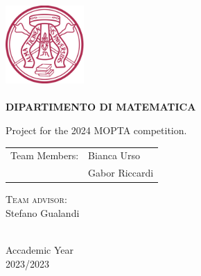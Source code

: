 \thispagestyle{empty}
\begin{center}
	\hrulefill \\
\end{center}

\begin{center}
	\includegraphics[width=3cm]{unipv.png}\\
	
	 \\
	{\bf DIPARTIMENTO DI MATEMATICA }\\
	\vspace*{1cm}
	
	
	\vspace{-8pt}
	\normalsize 
\end{center}
\vspace{2cm}


\begin{center}
	\large Project for the 2024 MOPTA competition.
	

\end{center}

\vspace*{3cm}

\begin{flushleft}
	\begin{tabular}{ll}
		{\sc Team Members:} & {\sc Bianca Urso }\\
        {\sc } & {\sc Gabor Riccardi} %
	\end{tabular}
\end{flushleft}

\vfill

\begin{flushright}
	\textsc{Team advisor:} \\
	{\sc Stefano Gualandi} \\
	
\end{flushright}

\vfill

\begin{center}
	\hrulefill \\
	\small Accademic Year  \\ 2023/2023

\end{center}


